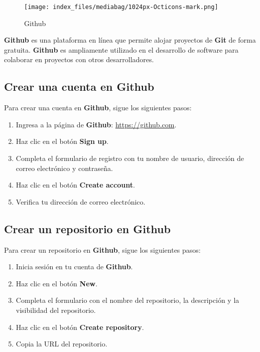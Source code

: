 \documentclass[
  a4paper,
  DIV=11,
  numbers=noendperiod,
  onepage,
  openany]{scrreprt}
\begin{document}
\begin{figure}[H]

{\centering \texttt{[image: index\_files/mediabag/1024px-Octicons-mark.png]}

}

\caption{Github}

\end{figure}%

\textbf{Github} es una plataforma en línea que permite alojar proyectos
de \textbf{Git} de forma gratuita. \textbf{Github} es ampliamente
utilizado en el desarrollo de software para colaborar en proyectos con
otros desarrolladores.

\subsection{Crear una cuenta en
Github}\label{crear-una-cuenta-en-github}

Para crear una cuenta en \textbf{Github}, sigue los siguientes pasos:

\begin{enumerate}
\def\labelenumi{\arabic{enumi}.}
\item
  Ingresa a la página de \textbf{Github}: \url{https://github.com}.
\item
  Haz clic en el botón \textbf{Sign up}.
\item
  Completa el formulario de registro con tu nombre de usuario, dirección
  de correo electrónico y contraseña.
\item
  Haz clic en el botón \textbf{Create account}.
\item
  Verifica tu dirección de correo electrónico.
\end{enumerate}

\subsection{Crear un repositorio en
Github}\label{crear-un-repositorio-en-github}

Para crear un repositorio en \textbf{Github}, sigue los siguientes
pasos:

\begin{enumerate}
\def\labelenumi{\arabic{enumi}.}
\item
  Inicia sesión en tu cuenta de \textbf{Github}.
\item
  Haz clic en el botón \textbf{New}.
\item
  Completa el formulario con el nombre del repositorio, la descripción y
  la visibilidad del repositorio.
\item
  Haz clic en el botón \textbf{Create repository}.
\item
  Copia la URL del repositorio.
\end{enumerate}
\end{document}
